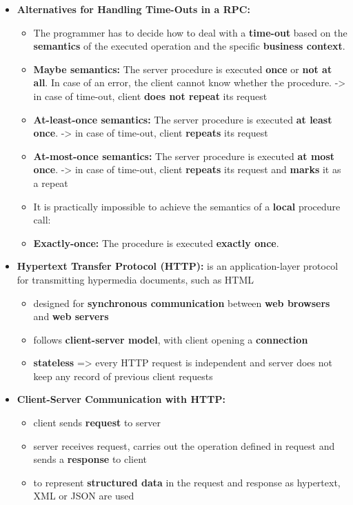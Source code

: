 \documentclass[ieeetran]{article}
\begin{document}
\begin{itemize}
\item \textbf{Alternatives for Handling Time-Outs in a RPC:}
	\begin{itemize}
		\item The programmer has to decide how to deal with a \textbf{time-out} based on the \textbf{semantics} of the executed operation and the specific \textbf{business context}.
	
	\item \textbf{Maybe semantics:} The server procedure is executed \textbf{once} or \textbf{not at all}. In case of an error, the client cannot know whether the procedure. -> in case of time-out, client \textbf{does not repeat} its request
\item \textbf{At-least-once semantics:} The server procedure is executed \textbf{at least once}. -> in case of time-out, client \textbf{repeats} its request
\item \textbf{At-most-once semantics:} The server procedure is executed \textbf{at most once}. -> in case of time-out, client \textbf{repeats} its request and \textbf{marks} it as a repeat 
\item It is practically impossible to achieve the semantics of a \textbf{local} procedure call:
\item \textbf{Exactly-once:} The procedure is executed \textbf{exactly once}.
	\end{itemize}

\pagebreak
\item \textbf{Hypertext Transfer Protocol (HTTP):} is an application-layer protocol for transmitting hypermedia documents, such as HTML 
	\begin{itemize}
\item designed for \textbf{synchronous communication} between \textbf{web browsers} and \textbf{web servers}
\item follows \textbf{client-server model}, with client opening a \textbf{connection}
\item \textbf{stateless} => every HTTP request is independent and server does not keep any record of previous client requests
	\end{itemize}

\item \textbf{Client-Server Communication with HTTP:}
	\begin{itemize}
	  \item client sends \textbf{request} to server
	\item server receives request, carries out the operation defined in request and sends a \textbf{response} to client
	\item to represent \textbf{structured data} in the request and response as hypertext, XML or JSON are used
	\end{itemize}


\end{itemize}
\end{document}

